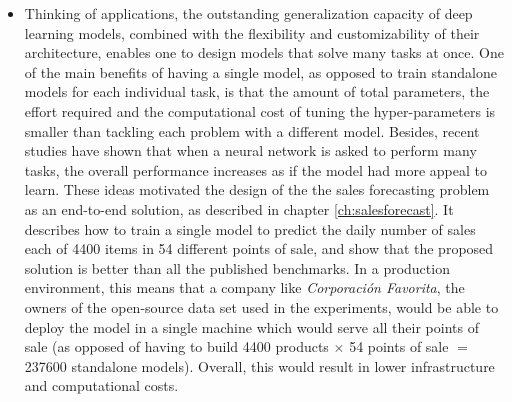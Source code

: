 \begin{itemize}
\item Thinking of applications, the outstanding generalization capacity of deep learning models, combined with the flexibility and customizability of their architecture, enables one to design models that solve many tasks at once. One of the main benefits of having a single model, as opposed to train standalone models for each individual task, is that the amount of total parameters, the effort required and the computational cost of tuning the hyper-parameters is smaller than tackling each problem with a different model. Besides, recent studies have shown that when a neural network is asked to perform many tasks, the overall performance increases \autocite{Jaderberg2016} as if the model had more appeal to learn. These ideas motivated the design of the the sales forecasting problem as an end-to-end solution, as described in chapter \ref{ch:salesforecast}. It describes how to train a single model to predict the daily number of sales each of 4400 items in 54 different points of sale, and show that the proposed solution is better than all the published benchmarks. In a production environment, this means that a company like \textit{Corporación Favorita}, the owners of the open-source data set used in the experiments, would be able to deploy the model in a single machine which would serve all their points of sale (as opposed of having to build 4400 products $\times$ 54 points of sale $=$ 237600 standalone models). Overall, this would result in lower infrastructure and computational costs.


\end{itemize}
